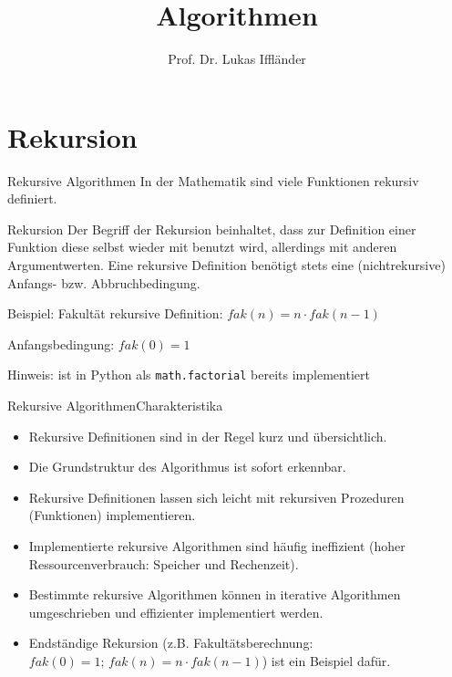 \documentclass[xelatex,aspectratio=169]{beamer}
\title{Algorithmen}
\author{Prof. Dr. Lukas Iffländer}
\institute{HTW Dresden}
\date{}
\begin{document}
\section{Rekursion}

\begin{frame}{Rekursive Algorithmen}
  In der Mathematik sind viele Funktionen rekursiv definiert.
  \begin{block}{Rekursion}
    Der Begriff der Rekursion beinhaltet, dass zur Definition einer Funktion diese selbst wieder mit benutzt wird, allerdings mit
    anderen Argumentwerten. Eine rekursive Definition benötigt stets eine (nichtrekursive) Anfangs- bzw. Abbruchbedingung.
  \end{block}
  \begin{exampleblock}{Beispiel: Fakultät}
    rekursive Definition: \(fak(n) = n \cdot fak(n-1)\)

    Anfangsbedingung: \(fak(0) = 1\)

    Hinweis: ist in Python als \texttt{math.factorial} bereits implementiert
  \end{exampleblock}
\end{frame}

\begin{frame}{Rekursive Algorithmen}{Charakteristika}
  \begin{itemize}
    \item Rekursive Definitionen sind in der Regel kurz und übersichtlich.
    \item Die Grundstruktur des Algorithmus ist sofort erkennbar.
    \item Rekursive Definitionen lassen sich leicht mit rekursiven Prozeduren (Funktionen) implementieren.
    \item Implementierte rekursive Algorithmen sind häufig ineffizient (hoher Ressourcenverbrauch: Speicher und Rechenzeit).
    \item Bestimmte rekursive Algorithmen können in iterative Algorithmen umgeschrieben und effizienter implementiert werden.
    \item Endständige Rekursion (z.B. Fakultätsberechnung: \(fak(0) = 1; \, fak(n) = n \cdot fak(n-1)\)) ist ein Beispiel dafür.
  \end{itemize}
\end{frame}
\end{document}
